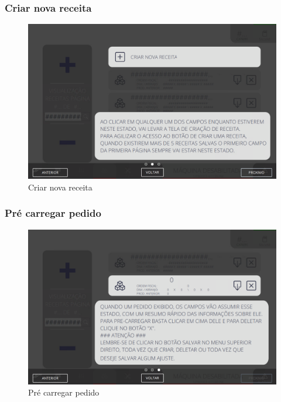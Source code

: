 \newpage
\thispagestyle{fancy}
\vspace*{40 pt}
\subsubsection{\small{Criar nova receita}} \label{sec:telaVisualizacaoReceitasCriarNovaReceita}
\vspace*{\fill}
\begin{figure}[h]
    \centering
    \includegraphics[width=576 px,height=360 px]{src/imagesICV/09-request/visualization/e-2.png}
    \caption{Criar nova receita}
\end{figure}
\vspace*{\fill}

\newpage
\thispagestyle{fancy}
\vspace*{40 pt}
\subsubsection{\small{Pré carregar pedido}} \label{sec:telaVisualizacaoReceitasPreCarregarPedido}
\vspace*{\fill}
\begin{figure}[h]
    \centering
    \includegraphics[width=576 px,height=360 px]{src/imagesICV/09-request/visualization/e-3.png}
    \caption{Pré carregar pedido}
\end{figure}
\vspace*{\fill}

